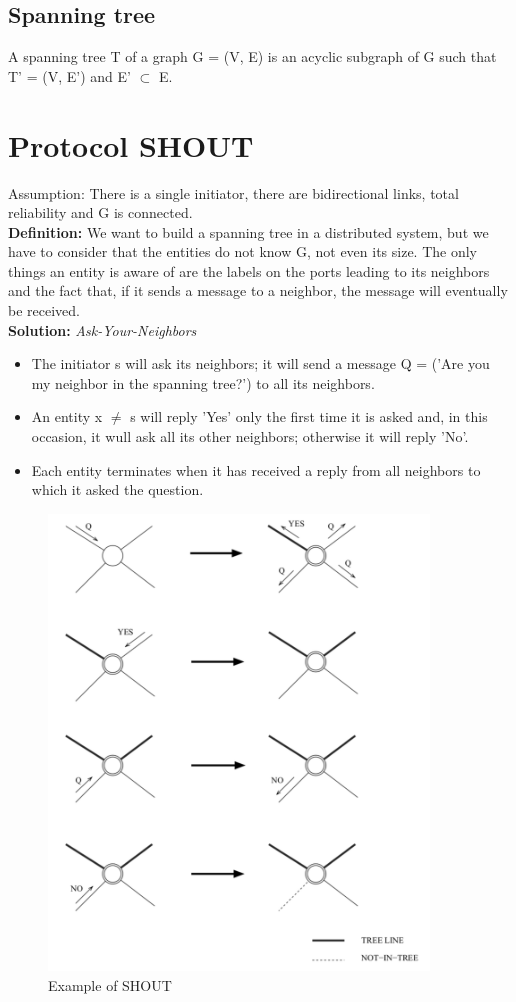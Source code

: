 \documentclass[paper=a4, fontsize=11pt]{scrartcl} %
\numberwithin{equation}{section} %
\numberwithin{figure}{section} %
\numberwithin{table}{section} %
\begin{document}
\subsection*{Spanning tree}
A spanning tree T of a graph G = (V, E) is an acyclic subgraph of G such that T' = (V, E') and E' $\subset$ E.
\section*{Protocol SHOUT}
Assumption: There is a single initiator, there are bidirectional links, total reliability and G is connected. \\
\textbf{Definition:} We want to build a spanning tree in a distributed system, but we have to consider that the entities do not know G, not even its size. The only things an entity is aware of are the labels on the ports leading to its neighbors and the fact that, if it sends a message to a neighbor, the message will eventually be received.\\
\textbf{Solution:} \textit{Ask-Your-Neighbors}
\begin{itemize}
\item The initiator s will ask its neighbors; it will send a message Q = ('Are you my neighbor in the spanning tree?') to all its neighbors.
\item An entity x $\neq$ s will reply 'Yes' only the first time it is asked and, in this occasion, it wull ask all its other neighbors; otherwise it will reply 'No'.
\item Each entity terminates when it has received a reply from all neighbors to which it asked the question.
\end{itemize}
\begin{figure}[H]
  \centering
  \includegraphics[width=0.9\textwidth]{img/shout.png}
  \caption{Example of SHOUT}
  \label{fig:boat1}
\end{figure}
\end{document}
